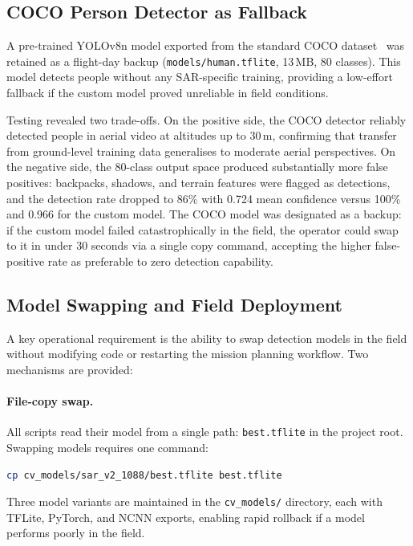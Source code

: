 \documentclass[10pt,a4paper]{article}
\begin{document}
\subsection{COCO Person Detector as Fallback}\label{sec:inference:coco}

A pre-trained YOLOv8n model exported from the standard COCO dataset~\cite{lin2014coco} was retained as a flight-day backup (\texttt{models/human.tflite}, 13\,MB, 80 classes). This model detects people without any SAR-specific training, providing a low-effort fallback if the custom model proved unreliable in field conditions.

Testing revealed two trade-offs. On the positive side, the COCO detector reliably detected people in aerial video at altitudes up to 30\,m, confirming that transfer from ground-level training data generalises to moderate aerial perspectives. On the negative side, the 80-class output space produced substantially more false positives: backpacks, shadows, and terrain features were flagged as detections, and the detection rate dropped to 86\% with 0.724 mean confidence versus 100\% and 0.966 for the custom model. The COCO model was designated as a backup: if the custom model failed catastrophically in the field, the operator could swap to it in under 30 seconds via a single copy command, accepting the higher false-positive rate as preferable to zero detection capability.

\subsection{Model Swapping and Field Deployment}\label{sec:inference:swapping}

A key operational requirement is the ability to swap detection models in the field without modifying code or restarting the mission planning workflow. Two mechanisms are provided:

\paragraph{File-copy swap.} All scripts read their model from a single path: \texttt{best.tflite} in the project root. Swapping models requires one command:
\begin{lstlisting}[language=bash,numbers=none]
cp cv_models/sar_v2_1088/best.tflite best.tflite
\end{lstlisting}
Three model variants are maintained in the \texttt{cv\_models/} directory, each with TFLite, PyTorch, and NCNN exports, enabling rapid rollback if a model performs poorly in the field.
\end{document}
